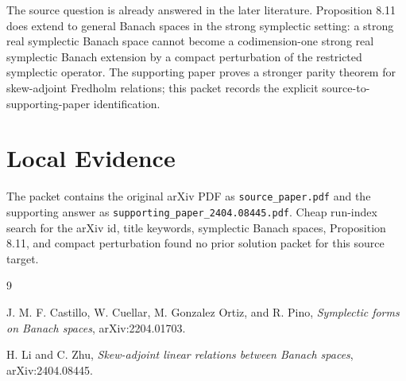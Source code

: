 \documentclass[11pt]{article}
\begin{document}
The source question is already answered in the later literature. Proposition
8.11 does extend to general Banach spaces in the strong symplectic setting:
a strong real symplectic Banach space cannot become a codimension-one strong
real symplectic Banach extension by a compact perturbation of the restricted
symplectic operator. The supporting paper proves a stronger parity theorem for
skew-adjoint Fredholm relations; this packet records the explicit source-to-
supporting-paper identification.

\section*{Local Evidence}

The packet contains the original arXiv PDF as \texttt{source\_paper.pdf} and
the supporting answer as \texttt{supporting\_paper\_2404.08445.pdf}. Cheap
run-index search for the arXiv id, title keywords, symplectic Banach spaces,
Proposition 8.11, and compact perturbation found no prior solution packet for
this source target.

\begin{thebibliography}{9}

J. M. F. Castillo, W. Cuellar, M. Gonzalez Ortiz, and R. Pino,
\emph{Symplectic forms on Banach spaces}, arXiv:2204.01703.

H. Li and C. Zhu,
\emph{Skew-adjoint linear relations between Banach spaces}, arXiv:2404.08445.

\end{thebibliography}
\end{document}
